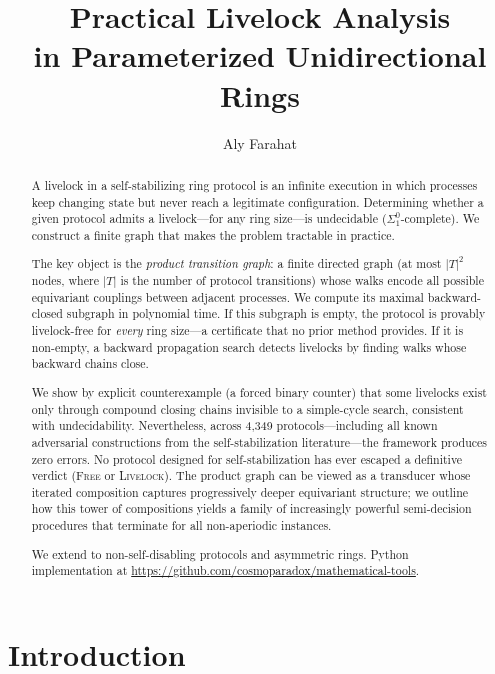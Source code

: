 \documentclass[11pt]{article}
\title{Practical Livelock Analysis\\in Parameterized Unidirectional Rings}
\author{Aly Farahat}
\date{}
\begin{document}
\maketitle

\begin{abstract}
A livelock in a self-stabilizing ring protocol is an infinite execution in which processes keep changing state but never reach a legitimate configuration. Determining whether a given protocol admits a livelock---for any ring size---is undecidable ($\Sigma^0_1$-complete). We construct a finite graph that makes the problem tractable in practice.

The key object is the \emph{product transition graph}: a finite directed graph (at most $|T|^2$ nodes, where $|T|$ is the number of protocol transitions) whose walks encode all possible equivariant couplings between adjacent processes. We compute its maximal backward-closed subgraph in polynomial time. If this subgraph is empty, the protocol is provably livelock-free for \emph{every} ring size---a certificate that no prior method provides. If it is non-empty, a backward propagation search detects livelocks by finding walks whose backward chains close.

We show by explicit counterexample (a forced binary counter) that some livelocks exist only through compound closing chains invisible to a simple-cycle search, consistent with undecidability. Nevertheless, across 4{,}349 protocols---including all known adversarial constructions from the self-stabilization literature---the framework produces zero errors. No protocol designed for self-stabilization has ever escaped a definitive verdict (\textsc{Free} or \textsc{Livelock}). The product graph can be viewed as a transducer whose iterated composition captures progressively deeper equivariant structure; we outline how this tower of compositions yields a family of increasingly powerful semi-decision procedures that terminate for all non-aperiodic instances.

We extend to non-self-disabling protocols and asymmetric rings. Python implementation at \url{https://github.com/cosmoparadox/mathematical-tools}.
\end{abstract}

\section{Introduction}
\label{sec:intro}
\end{document}
